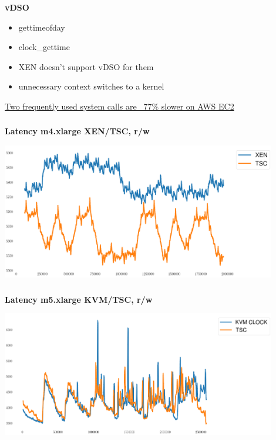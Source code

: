 \documentclass[usenames,dvipsnames, 18pt, compress, aspectratio=169]{beamer}
\begin{document}
\begin{frame}
    \frametitle{}
    \begin{center}
    \textbf{vDSO}

        \begin{itemize}[label={\MVRightarrow}]
            \item gettimeofday
            \item clock\_gettime
            \item XEN doesn't support vDSO for them
            \item unnecessary context switches to a kernel
        \end{itemize}

        \normalsize{\href{
            https://blog.packagecloud.io/eng/2017/03/08/system-calls-are-much-slower-on-ec2/
        }{Two frequently used system calls are ~77\% slower on AWS EC2}}
    \end{center}
\end{frame}

\begin{frame}
    \frametitle{}
    \begin{center}
    \textbf{Latency m4.xlarge XEN/TSC, r/w}

        \includegraphics[width=0.9\textwidth,center]{m4_clock_source.png}

    \end{center}
\end{frame}

\begin{frame}
    \frametitle{}
    \begin{center}
    \textbf{Latency m5.xlarge KVM/TSC, r/w}

        \includegraphics[width=0.9\textwidth,center]{m5_clock_source.png}

    \end{center}
\end{frame}
\end{document}

